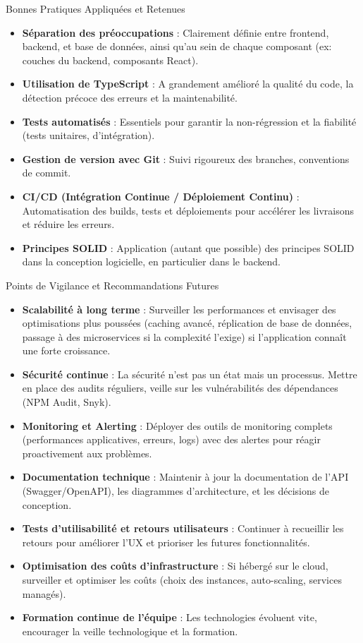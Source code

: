 \documentclass[11pt,a4paper]{report}
\begin{document}
\begin{tipbox}{Bonnes Pratiques Appliquées et Retenues}
\begin{itemize}
    \item \textbf{Séparation des préoccupations} : Clairement définie entre frontend, backend, et base de données, ainsi qu'au sein de chaque composant (ex: couches du backend, composants React).
    \item \textbf{Utilisation de TypeScript} : A grandement amélioré la qualité du code, la détection précoce des erreurs et la maintenabilité.
    \item \textbf{Tests automatisés} : Essentiels pour garantir la non-régression et la fiabilité (tests unitaires, d'intégration).
    \item \textbf{Gestion de version avec Git} : Suivi rigoureux des branches, conventions de commit.
    \item \textbf{CI/CD (Intégration Continue / Déploiement Continu)} : Automatisation des builds, tests et déploiements pour accélérer les livraisons et réduire les erreurs.
    \item \textbf{Principes SOLID} : Application (autant que possible) des principes SOLID dans la conception logicielle, en particulier dans le backend.
\end{itemize}
\end{tipbox}

\begin{infobox}{Points de Vigilance et Recommandations Futures}
\begin{itemize}
    \item \textbf{Scalabilité à long terme} : Surveiller les performances et envisager des optimisations plus poussées (caching avancé, réplication de base de données, passage à des microservices si la complexité l'exige) si l'application connaît une forte croissance.
    \item \textbf{Sécurité continue} : La sécurité n'est pas un état mais un processus. Mettre en place des audits réguliers, veille sur les vulnérabilités des dépendances (NPM Audit, Snyk).
    \item \textbf{Monitoring et Alerting} : Déployer des outils de monitoring complets (performances applicatives, erreurs, logs) avec des alertes pour réagir proactivement aux problèmes.
    \item \textbf{Documentation technique} : Maintenir à jour la documentation de l'API (Swagger/OpenAPI), les diagrammes d'architecture, et les décisions de conception.
    \item \textbf{Tests d'utilisabilité et retours utilisateurs} : Continuer à recueillir les retours pour améliorer l'UX et prioriser les futures fonctionnalités.
    \item \textbf{Optimisation des coûts d'infrastructure} : Si hébergé sur le cloud, surveiller et optimiser les coûts (choix des instances, auto-scaling, services managés).
    \item \textbf{Formation continue de l'équipe} : Les technologies évoluent vite, encourager la veille technologique et la formation.
\end{itemize}
\end{infobox}
\end{document}
